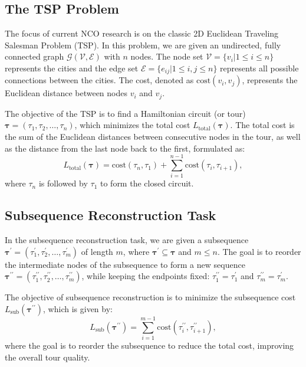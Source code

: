 \subsection{The TSP Problem}
The focus of current NCO research is on the classic 2D Euclidean Traveling Salesman Problem (TSP). 
In this problem, we are given an undirected, fully connected graph $\mathcal{G}(\mathcal{V}, \mathcal{E})$ with $n$ nodes.  The node set $\mathcal{V}=\{v_i | 1\leq i \leq n\}$ represents the cities and the edge set $\mathcal{E}=\{e_{ij} | 1\leq i, j\leq n\}$ represents all possible connections between the cities. The cost, denoted as $\text{cost}(v_i, v_j)$, represents the Euclidean distance between nodes $v_i$ and $v_j$. 

The objective of the TSP is to find a Hamiltonian circuit (or tour) $\boldsymbol{\tau} = (\tau_1, \tau_2, \dots, \tau_n)$, which minimizes the total cost $L_{\text{total}}(\boldsymbol{\tau})$. The total cost is the sum of the Euclidean distances between consecutive nodes in the tour, as well as the distance from the last node back to the first, formulated as: 
\begin{equation}
{L_{\text{total}}(\boldsymbol{\tau})=\text{cost}(\tau_n, \tau_1)+\sum\limits_{i=1}^{n-1}{\text{cost}(\tau_i, \tau_{i+1})}},
\end{equation}
where $\tau_n$ is followed by $\tau_1$ to form the closed circuit.
  
\subsection{Subsequence Reconstruction Task}
In the subsequence reconstruction task, we are given a subsequence $\boldsymbol{\tau}^{\prime} = (\tau_1^{\prime}, \tau_2^{\prime}, \dots, \tau_{m}^{\prime})$ of length $m$, where $\boldsymbol{\tau}^{\prime} \subseteq \boldsymbol{\tau}$ and $m \leq n$. 
The goal is to reorder the intermediate nodes of the subsequence to form a new sequence $\boldsymbol{\tau}^{\prime\prime} = (\tau_1^{\prime\prime}, \tau_2^{\prime\prime}, \dots, \tau_{m}^{\prime\prime})$, while keeping the endpoints fixed: $\tau_1^{\prime\prime}=\tau_1^{\prime}$ and $\tau_m^{\prime\prime}=\tau_m^{\prime}$. 

The objective of subsequence reconstruction is to minimize the subsequence cost $L_{\text{sub}}(\boldsymbol{\tau}^{\prime\prime})$, which is given by:
\begin{equation}
{L_{\text{sub}}(\boldsymbol{\tau}^{\prime\prime})=\sum\limits_{i=1}^{m-1}{\text{cost}(\tau_i^{\prime\prime}, \tau_{i+1}^{\prime\prime})}},
\end{equation}
where the goal is to reorder the subsequence to reduce the total cost, improving the overall tour quality.


